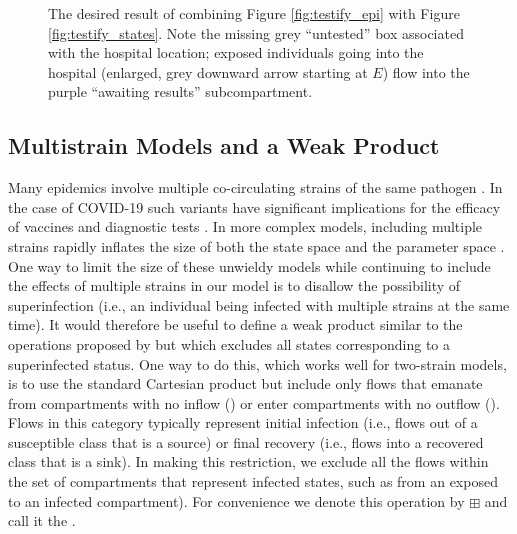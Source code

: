 \begin{figure}
    \centering
    
    \caption{The desired result of combining Figure \ref{fig:testify_epi} with Figure \ref{fig:testify_states}. Note the missing grey ``untested'' box associated with the hospital location; exposed individuals going into the hospital (enlarged, grey downward arrow starting at $E$) flow into the purple ``awaiting results'' subcompartment.}
    \label{fig:testify_desired}
\end{figure}

\FloatBarrier


\subsection{Multistrain Models and a Weak Product}\label{wp}
Many epidemics involve multiple co-circulating strains of the same pathogen \citep{gog2002dynamics, williams2021localization}. In the case of COVID-19 such variants have significant implications for the efficacy of vaccines \citep{abu2021effectiveness, koyama2020emergence} and diagnostic tests \citep{vasireddy2021review}. In more complex models, including multiple strains rapidly inflates the size of both the state space and the parameter space \citep{kryazhimskiy2007state}. One way to limit the size of these unwieldy models while continuing to include the effects of multiple strains in our model is to disallow the possibility of superinfection (i.e., an individual being infected with multiple strains at the same time).  It would therefore be useful to define a weak product similar to the operations proposed by \cite{worden2017products} but which excludes all states corresponding to a superinfected status. One way to do this, which works well for two-strain models, is to use the standard Cartesian product but include only flows that emanate from compartments with no inflow () or enter compartments with no outflow (). Flows in this category typically represent initial infection (i.e., flows out of a susceptible class that is a source) or final recovery (i.e., flows into a recovered class that is a sink). In making this restriction, we exclude all the flows within the set of compartments that represent infected states, such as from an exposed to an infected compartment).
For convenience we denote this operation by $\boxplus$ and call it the .

